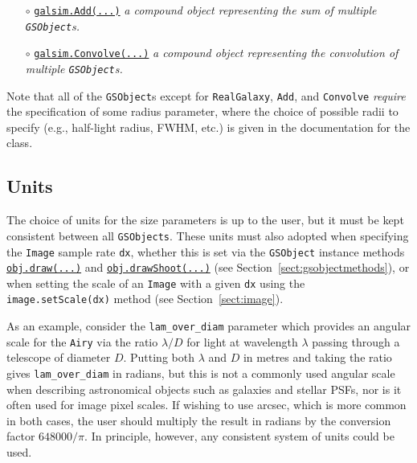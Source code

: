 \documentclass[preprint,11pt]{aastex}
\begin{document}
\begin{itemize}
\item[$\circ$]
  \href{http://galsim-developers.github.com/GalSim/classgalsim_1_1base_1_1_add.html}{\texttt{galsim.Add(...)}}
  \newline \emph{a \emph{compound} object representing the sum of 
  multiple \texttt{GSObject}s.}
\item[$\circ$]
  \href{http://galsim-developers.github.com/GalSim/classgalsim_1_1base_1_1_convolve.html}{\texttt{galsim.Convolve(...)}}
  \newline \emph{a \emph{compound} object representing the convolution of 
multiple \texttt{GSObject}s.}
\end{itemize}

Note that all of the \texttt{GSObject}s except for \texttt{RealGalaxy}, \texttt{Add}, and
\texttt{Convolve} {\em require} the specification of some radius parameter, where the choice of
possible radii to specify (e.g., half-light radius, FWHM, etc.) is given in the documentation for
the class.

\subsection{Units}
The choice of units for the size parameters is up to the user,
but it must be kept consistent between all \texttt{GSObjects}.  These
units must also adopted when specifying the \texttt{Image} sample
rate \texttt{dx}, whether this is set via the \texttt{GSObject}
instance methods \href{http://galsim-developers.github.com/GalSim/classgalsim_1_1base_1_1_g_s_object.html#ae0b346a8b438dedbc7f60a52220869d8}{\texttt{obj.draw(...)}}
and
\href{http://galsim-developers.github.com/GalSim/classgalsim_1_1base_1_1_g_s_object.html#a42ac334d2840ba3fa832988e998beca0}{\texttt{obj.drawShoot(...)}}
(see Section~\ref{sect:gsobjectmethods}),
or when setting the scale of an \texttt{Image} with a given
\texttt{dx} using the \texttt{image.setScale(dx)} method (see Section~\ref{sect:image}).

As an example, consider the
\texttt{lam\_over\_diam} parameter which provides an angular scale for
the \texttt{Airy} via
the ratio $\lambda / D$ for light at wavelength $\lambda$ passing
through a telescope of diameter $D$. Putting both $\lambda$ and
$D$ in metres and taking the ratio gives \texttt{lam\_over\_diam} in
radians, but this is not a commonly used angular scale when describing
astronomical objects such as galaxies and stellar PSFs, nor is
it often used for image pixel scales.  If wishing to use arcsec, which
is more common in both cases, the user should multiply the result in
radians by the conversion factor
$648000 / \pi$.  In principle, however, any consistent
system of units could be used.
\end{document}
